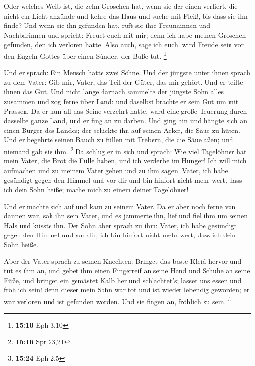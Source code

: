  Oder welches Weib ist, die zehn Groschen hat, wenn sie
der einen verliert, die nicht ein Licht anzünde und kehre das Haus und
suche mit Fleiß, bis dass sie ihn finde?  Und wenn sie ihn
gefunden hat, ruft sie ihre Freundinnen und Nachbarinnen und spricht:
Freuet euch mit mir; denn ich habe meinen Groschen gefunden, den ich
verloren hatte.  Also auch, sage ich euch, wird Freude
sein vor den Engeln Gottes über einen Sünder, der Buße tut. \footnote{\textbf{15:10}
  Eph 3,10}

 Und er sprach: Ein Mensch hatte zwei Söhne.
 Und der jüngste unter ihnen sprach zu dem Vater: Gib
mir, Vater, das Teil der Güter, das mir gehört. Und er teilte ihnen das
Gut.  Und nicht lange darnach sammelte der jüngste Sohn
alles zusammen und zog ferne über Land; und daselbst brachte er sein Gut
um mit Prassen.  Da er nun all das Seine verzehrt hatte,
ward eine große Teuerung durch dasselbe ganze Land, und er fing an zu
darben.  Und ging hin und hängte sich an einen Bürger des
Landes; der schickte ihn auf seinen Acker, die Säue zu hüten.
 Und er begehrte seinen Bauch zu füllen mit Trebern, die
die Säue aßen; und niemand gab sie ihm. \footnote{\textbf{15:16} Spr
  23,21}  Da schlug er in sich und sprach: Wie viel
Tagelöhner hat mein Vater, die Brot die Fülle haben, und ich verderbe im
Hunger!  Ich will mich aufmachen und zu meinem Vater
gehen und zu ihm sagen: Vater, ich habe gesündigt gegen den Himmel und
vor dir  und bin hinfort nicht mehr wert, dass ich dein
Sohn heiße; mache mich zu einem deiner Tagelöhner!

 Und er machte sich auf und kam zu seinem Vater. Da er
aber noch ferne von dannen war, sah ihn sein Vater, und es jammerte ihn,
lief und fiel ihm um seinen Hals und küsste ihn.  Der
Sohn aber sprach zu ihm: Vater, ich habe gesündigt gegen den Himmel und
vor dir; ich bin hinfort nicht mehr wert, dass ich dein Sohn heiße.

 Aber der Vater sprach zu seinen Knechten: Bringet das
beste Kleid hervor und tut es ihm an, und gebet ihm einen Fingerreif an
seine Hand und Schuhe an seine Füße,  und bringet ein
gemästet Kalb her und schlachtet's; lasset uns essen und fröhlich sein!
 denn dieser mein Sohn war tot und ist wieder lebendig
geworden; er war verloren und ist gefunden worden. Und sie fingen an,
fröhlich zu sein. \footnote{\textbf{15:24} Eph 2,5}

